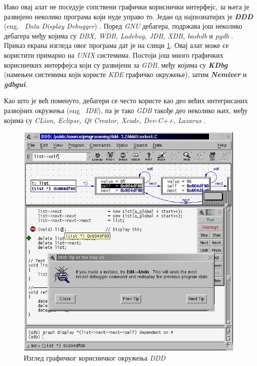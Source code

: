 \documentclass[a4paper]{article}
\begin{document}
Иако овај алат не поседује сопствени графички кориснички интерфејс,
за њега је развијено неколико програма који нуде управо то.
Један од најпознатијих је \textbf{\em DDD} (eng. ~{\em Data Display Debugger}) \cite{artOfDebugging}.
Поред {\em GNU} дебагера, подржава још неколико дебагера међу којима су 
{\em DBX, WDB, Ladebug, JDB, XDB, bashdb} и {\em pydb} \cite{ddd}. 
Приказ екрана изгледа овог програма дат је на слици \ref{fig:ddd}.
Овај алат може се користити примарно на {\em UNIX} системима.
Постоји још много графичких корисничких интерфејса који су развијени 
за {\em GDB}, међу којима су \textbf{\em KDbg} (намењен системима који
користе {\em KDE} графичко окружење), затим \textbf{\em Nemiver} и \textbf{\em gdbgui}.

Као што је већ поменуто, дебагери се често користе као део већих
интегрисаних развојних окружења (eng ~{\em IDE}), па је тако {\em GDB}
такође део неколико њих, међу којима су {\em CLion, Eclipse, Qt Creator, Xcode, Dev-C++, Lazarus} \cite{gdbGui}.

\begin{figure}
    \begin{center}
        \includegraphics[scale=0.4]{slike/ddd.png}
    \end{center}
    \caption{Изглед графичког корисничког окружења {\em DDD}}
    \label{fig:ddd}
\end{figure}
\end{document}
